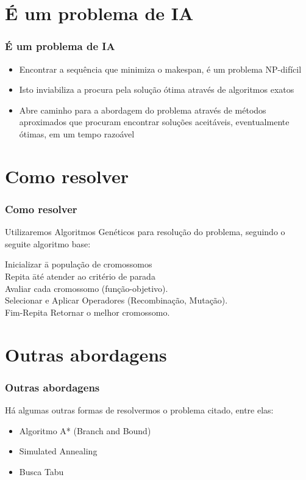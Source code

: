 \documentclass[12pt]{beamer}
\begin{document}
\section{É um problema de IA}
\begin{frame}
        \frametitle{É um problema de IA}
        \begin{block}{}
                \begin{itemize}
                        \item Encontrar a sequência que minimiza o makespan, é um problema NP-difícil   \pause
                        \item Isto inviabiliza a procura pela solução ótima através de algoritmos exatos   \pause
                        \item Abre caminho para a abordagem do problema através de métodos aproximados que procuram encontrar soluções aceitáveis, eventualmente ótimas, em um tempo razoável  \pause
                \end{itemize}
        \end{block}
\end{frame}

\section{Como resolver} 
\begin{frame} 
        \frametitle{Como resolver}
        \begin{block}{Utilizaremos Algoritmos Genéticos para resolução do problema, seguindo o seguite algoritmo base:}
	\begin{tabbing}
	Inicializar \= a população de cromossomos \\
	Repita \= até atender ao critério de parada \\
	\> Avaliar cada cromossomo (função-objetivo). \\
	\> Selecionar e Aplicar Operadores (Recombinação, Mutação).\\
	Fim-Repita Retornar o melhor cromossomo.
	\end{tabbing}
	\end{block}
\end{frame}

\section{Outras abordagens} 
\begin{frame} 
        \frametitle{Outras abordagens}
        \begin{block}{Há algumas outras formas de resolvermos o problema citado, entre elas:}
                \begin{itemize}
                        \item Algoritmo A* (Branch and Bound)    \pause
                        \item Simulated Annealing   \pause
                        \item Busca Tabu  \pause
                \end{itemize}
        \end{block}
\end{frame}
              
\end{document}
